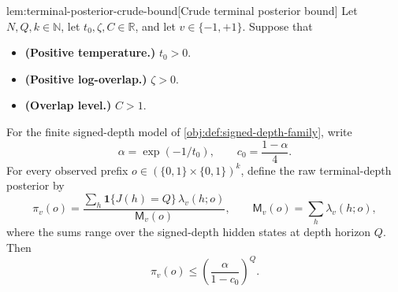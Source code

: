 \documentclass[11pt]{article}
\begin{document}
\begin{lemmav}{lem:terminal-posterior-crude-bound}[Crude terminal posterior bound]
Let \(N,Q,k\in\mathbb N\), let \(t_0,\zeta,C\in\mathbb R\), and let \(v\in\{-1,+1\}\). Suppose that
\begin{itemize}
\item \textbf{(Positive temperature.)} \(t_0>0\).
\item \textbf{(Positive log-overlap.)} \(\zeta>0\).
\item \textbf{(Overlap level.)} \(C>1\).
\end{itemize}
For the finite signed-depth model of \cref{obj:def:signed-depth-family}, write
\[
\alpha=\exp(-1/t_0),
\qquad
c_0=\frac{1-\alpha}{4}.
\]
For every observed prefix \(o\in(\{0,1\}\times\{0,1\})^k\), define the raw terminal-depth posterior by
\[
\pi_v(o)
=
\frac{
\sum_h \mathbf 1\{J(h)=Q\}\,\lambda_v(h;o)
}{
\mathsf M_v(o)
},
\qquad
\mathsf M_v(o)=\sum_h \lambda_v(h;o),
\]
where the sums range over the signed-depth hidden states at depth horizon \(Q\). Then
\[
\pi_v(o)
\le
\left(\frac{\alpha}{1-c_0}\right)^Q .
\]
\end{lemmav}
\end{document}
